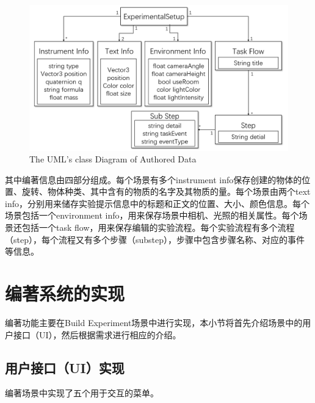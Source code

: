 \begin{figure}[!htp]
  \centering
  \includegraphics[width=12cm]{figure/setupclass.png}
    {The UML's class Diagram of Authored Data}
 \label{fig:uml}
\end{figure}

其中编著信息由四部分组成。每个场景有多个instrument info保存创建的物体的位置、旋转、物体种类、其中含有的物质的名字及其物质的量。每个场景由两个text info，分别用来储存实验提示信息中的标题和正文的位置、大小、颜色信息。每个场景包括一个environment info，用来保存场景中相机、光照的相关属性。每个场景还包括一个task flow，用来保存编辑的实验流程。每个实验流程有多个流程（step），每个流程又有多个步骤（substep），步骤中包含步骤名称、对应的事件等信息。

\section{编著系统的实现}

编著功能主要在Build Experiment场景中进行实现，本小节将首先介绍场景中的用户接口（UI），然后根据需求进行相应的介绍。

\subsection{用户接口（UI）实现}
编著场景中实现了五个用于交互的菜单。

